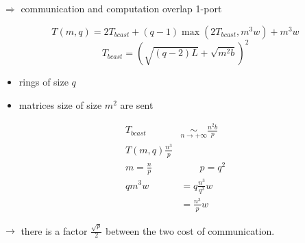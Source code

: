 $\Rightarrow$ communication and computation overlap 1-port

\[T(m,q)=2T_{bcast}+(q-1)\max (2T_{bcast},m^3w)+m^3w\]
\[T_{bcast}=(\sqrt{(q-2)L}+\sqrt{m^2b})^2\]
\begin{itemize}
\item rings of size $q$
\item matrices size of size $m^2$ are sent
\end{itemize}

\begin{align*}
T_{bcast} &\underset{n\to +\infty}{\sim}\frac{n^2b}{p}\\
T(m,q)\frac{n^3}{p}\\
m=\frac{n}{p} &\qquad p=q^2\\
qm^3w &= q \frac{n^3}{q^3}w\\
& = \frac{n^3}{p}w
\end{align*}

$\to$ there is a factor $\frac{\sqrt{p}}{2}$ between the two cost of communication.